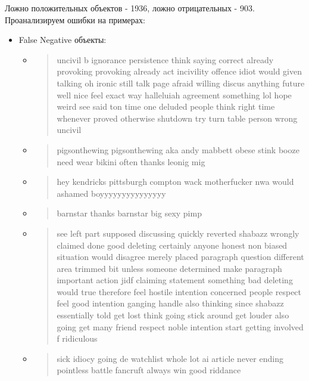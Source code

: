 \documentclass[14pt]{extarticle}
\begin{document}
Ложно положительных объектов - 1936, ложно отрицательных - 903. \\

Проанализируем ошибки на примерах: \\
\begin{itemize}
 \item False Negative объекты:
\begin{itemize}
    \item \begin{quote} uncivil b ignorance persistence think saying correct already provoking provoking already act incivility offence idiot would given talking oh ironic still talk page afraid willing discus anything future well nice feel exact way halleluiah agreement something lol hope weird see said ton time one deluded people think right time whenever proved otherwise shutdown try turn table person wrong uncivil \end{quote}
    \item \begin{quote} pigsonthewing pigsonthewing aka andy mabbett obese stink booze need wear bikini often thanks leonig mig \end{quote}
    \item \begin{quote} hey kendricks pittsburgh compton wack motherfucker nwa would ashamed boyyyyyyyyyyyyyyy \end{quote}
    \item \begin{quote} barnstar thanks barnstar big sexy pimp \end{quote}
    \item \begin{quote} see left part supposed discussing quickly reverted shabazz wrongly claimed done good deleting certainly anyone honest non biased situation would disagree merely placed paragraph question different area trimmed bit unless someone determined make paragraph important action jidf claiming statement something bad deleting would true therefore feel hostile intention concerned people respect feel good intention ganging handle also thinking since shabazz essentially told get lost think going stick around get louder also going get many friend respect noble intention start getting involved f ridiculous \end{quote}
    \item \begin{quote} sick idiocy going de watchlist whole lot ai article never ending pointless battle fancruft always win good riddance \end{quote}

\end{itemize}
\end{itemize}
\end{document}
